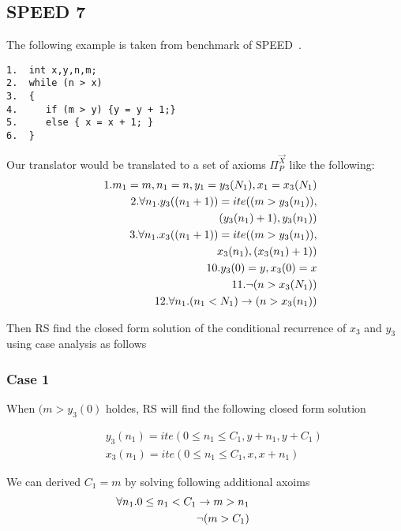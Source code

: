 \subsection{SPEED 7}
The following example is taken from benchmark of SPEED~\cite{speed1}.
\begin{verbatim}
1.  int x,y,n,m;
2.  while (n > x)
3.  {
4.     if (m > y) {y = y + 1;}
5.     else { x = x + 1; }
6.  }
\end{verbatim}

Our translator would be translated to a set of axioms $\Pi_P^{\vec{X}}$ like the following:
\begin{eqnarray*}
	&&1.m_1 = m, n_1 = n, y_1 = y_3(N_1), x_1 = x_3(N_1)\\
	&&2.\forall n_1.y_3((n_1+1)) = ite((m>y_3(n_1)),\\ 
	&&\hspace*{5em}(y_3(n_1)+1),y_3(n_1))\\ 
	&&3.\forall n_1.x_3((n_1+1)) = ite((m>y_3(n_1)), \\ &&\hspace*{5em}x_3(n_1),(x_3(n_1)+1))\\ 
	&&10.y_3(0) = y, x_3(0) = x\\
	&&11.\neg (n>x_3(N_1))\\
	&&12.\forall n_1.(n_1<N_1) \rightarrow (n>x_3(n_1))
\end{eqnarray*}

Then RS find the closed form solution of the conditional recurrence of $x_3$ and $y_3$ using case analysis as follows

\subsubsection{Case 1} When $(m>y_3(0)$ holdes, RS will find the following closed form solution

\begin{eqnarray*}
	&&y_3(n_1) = ite(0\leq n_1 \leq C_1,y+n_1,y+C_1)\\ 
	&&x_3(n_1) = ite(0\leq n_1 \leq C_1,x,x+n_1)
\end{eqnarray*}

We can derived $C_1=m$ by solving following additional axoims
\begin{eqnarray*}
	&&\hspace*{-5em}\forall n_1. 0 \leq n_1<C_1 \rightarrow m>n_1 \\
	&&\hspace*{-5em}\neg (m>C_1)
\end{eqnarray*}

